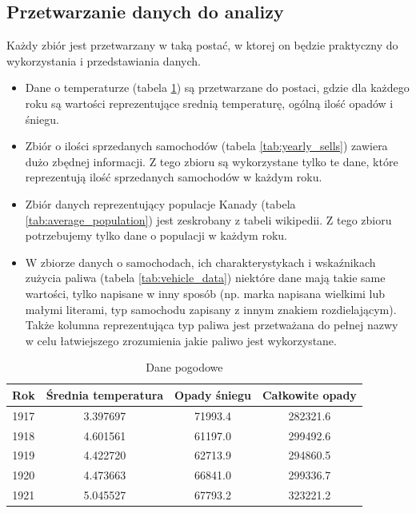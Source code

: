 \documentclass[9pt,a4paper,twoside]{rho}
\begin{document}
    \subsection*{Przetwarzanie danych do analizy}
        Każdy zbiór jest przetwarzany w taką postać, w ktorej on będzie praktyczny do wykorzystania i przedstawiania danych.
        \begin{itemize}
            \item Dane o temperaturze (tabela \ref{tab:weather_data}) są przetwarzane do postaci, gdzie dla każdego roku są wartości reprezentujące srednią temperaturę, ogólną ilość opadów i śniegu.
            \item Zbiór o ilości sprzedanych samochodów (tabela \ref{tab:yearly_sells}) zawiera dużo zbędnej informacji. Z tego zbioru są wykorzystane tylko te dane, które reprezentują ilość sprzedanych samochodów w każdym roku.
            \item Zbiór danych reprezentujący populacje Kanady (tabela \ref{tab:average_population}) jest zeskrobany z tabeli wikipedii. Z tego zbioru potrzebujemy tylko dane o populacji w każdym roku.
            \item W zbiorze danych o samochodach, ich charakterystykach i wskaźnikach zużycia paliwa (tabela \ref{tab:vehicle_data}) niektóre dane mają takie same wartości, tylko napisane w inny sposób (np. marka napisana wielkimi lub małymi literami, typ samochodu zapisany z innym znakiem rozdielającym). Także kolumna reprezentująca typ paliwa jest przetważana do pełnej nazwy w celu łatwiejszego zrozumienia jakie paliwo jest wykorzystane.
        \end{itemize}
        
            \begin{table}[ht]
            \centering
            \caption{Dane pogodowe}
            \label{tab:weather_data}
            \begin{tabular}{cccc}
            \toprule 
            Rok & Średnia temperatura & Opady śniegu & Całkowite opady \\ 
            \midrule
            1917 & 3.397697 & 71993.4 & 282321.6 \\
            1918 & 4.601561 & 61197.0 & 299492.6 \\
            1919 & 4.422720 & 62713.9 & 294860.5 \\
            1920 & 4.473663 & 66841.0 & 299336.7 \\
            1921 & 5.045527 & 67793.2 & 323221.2 \\
            \bottomrule
            \end{tabular}
            \end{table}
\end{document}
